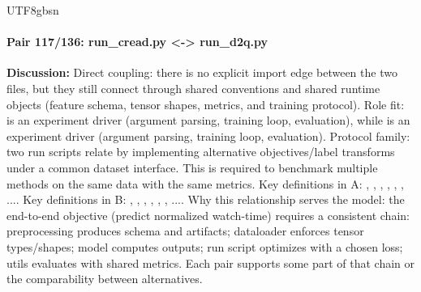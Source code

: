 \documentclass[11pt]{article}
\begin{document}
\begin{CJK*}{UTF8}{gbsn}
\paragraph{Pair 117/136: run\_cread.py <-> run\_d2q.py}
\textbf{Discussion:} Direct coupling: there is no explicit import edge between the two files, but they still connect through shared conventions and shared runtime objects (feature schema, tensor shapes, metrics, and training protocol). Role fit: \texttt{} is an experiment driver (argument parsing, training loop, evaluation), while \texttt{} is an experiment driver (argument parsing, training loop, evaluation). Protocol family: two run scripts relate by implementing alternative objectives/label transforms under a common dataset interface. This is required to benchmark multiple methods on the same data with the same metrics. Key definitions in A: \texttt{}, \texttt{}, \texttt{}, \texttt{}, \texttt{}, \texttt{}, .... Key definitions in B: \texttt{}, \texttt{}, \texttt{}, \texttt{}, \texttt{}, \texttt{}, .... Why this relationship serves the model: the end-to-end objective (predict normalized watch-time) requires a consistent chain: preprocessing produces schema and artifacts; dataloader enforces tensor types/shapes; model computes outputs; run script optimizes with a chosen loss; utils evaluates with shared metrics. Each pair supports some part of that chain or the comparability between alternatives.


\end{CJK*}
\end{document}
